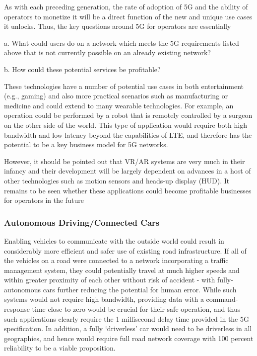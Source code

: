 {As with each preceding generation, the rate of adoption of 5G and the ability of operators to monetize it will be a direct function of the new and unique use cases it unlocks. Thus, the key questions around 5G for operators are essentially\\ \item a. What could users do on a network which meets the 5G requirements listed above that is not currently possible on an already existing network?\\  \item b. How could these potential services be profitable?\\

\item These technologies have a number of potential use cases in both entertainment (e.g., gaming) and also more practical scenarios such as manufacturing or medicine and could extend to many wearable technologies. For example, an operation could be performed by a robot that is remotely controlled by a surgeon on the other side of the world. This type of application would require both high bandwidth and low latency beyond the capabilities of LTE, and therefore has the potential to be a key business model for 5G networks.\\ 

\item However, it should be pointed out that VR/AR systems are very much in their infancy and their development will be largely dependent on advances in a host of other technologies such as motion sensors and heads-up display (HUD). It remains to be seen whether these applications could become profitable businesses for operators in the future\\}

\subsubsection{Autonomous Driving/Connected Cars}

Enabling vehicles to communicate with the outside world could result in considerably more efficient and safer use of existing road infrastructure. If all of the vehicles on a road were connected to a network incorporating a traffic management system, they could potentially travel at much higher speeds and within greater proximity of each other without risk of accident - with fully-autonomous cars further reducing the potential for human error. While such systems would not require high bandwidth, providing data with a command-response time close to zero would be crucial for their safe operation, and thus such applications clearly require the 1 millisecond delay time provided in the 5G specification. In addition, a fully ‘driverless’ car would need to be driverless in all geographies, and hence would require full road network coverage with 100 percent reliability to be a viable proposition.

